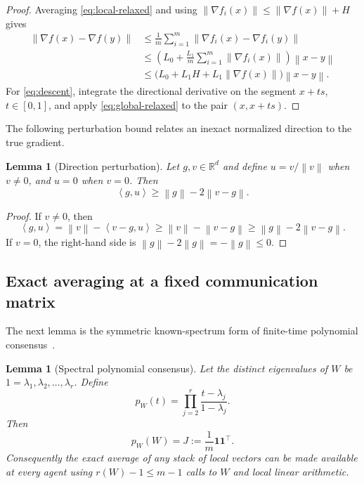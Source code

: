\documentclass[11pt,a4paper]{article}
\newcommand{\R}{\mathbb{R}}
\newcommand{\norm}[1]{\left\lVert #1\right\rVert}
\newcommand{\inner}[2]{\left\langle #1,#2\right\rangle}
\newcommand{\one}{\mathbf{1}}
\newtheorem{lemma}[theorem]{Lemma}
\theoremstyle{remark}
\begin{document}
\begin{proof}
Averaging \eqref{eq:local-relaxed} and using
$\norm{\nabla f_i(x)}\le\norm{\nabla f(x)}+H$ gives
\[
\begin{aligned}
 \norm{\nabla f(x)-\nabla f(y)}
 &\le \frac1m\sum_{i=1}^m
       \norm{\nabla f_i(x)-\nabla f_i(y)}\\
 &\le \left(L_0+\frac{L_1}{m}\sum_{i=1}^m
       \norm{\nabla f_i(x)}\right)\norm{x-y}\\
 &\le \bigl(L_0+L_1H+L_1\norm{\nabla f(x)}\bigr)\norm{x-y}.
\end{aligned}
\]
For \eqref{eq:descent}, integrate the directional derivative on the segment
$x+ts$, $t\in[0,1]$, and apply \eqref{eq:global-relaxed} to the pair
$(x,x+ts)$.
\end{proof}

The following perturbation bound relates an inexact normalized direction to
the true gradient.

\begin{lemma}[Direction perturbation]
\label{lem:direction}
Let $g,v\in\R^d$ and define $u=v/\norm v$ when $v\ne0$, and $u=0$ when
$v=0$.  Then
\begin{equation}
 \inner{g}{u}\ge\norm g-2\norm{v-g}.
 \label{eq:direction}
\end{equation}
\end{lemma}

\begin{proof}
If $v\ne0$, then
\[
 \inner g u=\norm v-\inner{v-g}{u}
 \ge\norm v-\norm{v-g}
 \ge\norm g-2\norm{v-g}.
\]
If $v=0$, the right-hand side is $\norm g-2\norm g=-\norm g\le0$.
\end{proof}
\subsection{Exact averaging at a fixed communication matrix}
The next lemma is the symmetric known-spectrum form of finite-time polynomial consensus~\cite{finiteconsensus2007}.

\begin{lemma}[Spectral polynomial consensus]
\label{lem:polynomial-consensus}
Let the distinct eigenvalues of $W$ be
$1=\lambda_1,\lambda_2,\ldots,\lambda_r$.  Define
\begin{equation}
 p_W(t)=\prod_{j=2}^{r}\frac{t-\lambda_j}{1-\lambda_j}.
 \label{eq:consensus-polynomial}
\end{equation}
Then
\begin{equation}
 p_W(W)=J:=\frac1m\one\one^\top.
 \label{eq:exact-consensus}
\end{equation}
Consequently the exact average of any stack of local vectors can be made
available at every agent using $r(W)-1\le m-1$ calls to $W$ and local linear
arithmetic.
\end{lemma}
\end{document}
